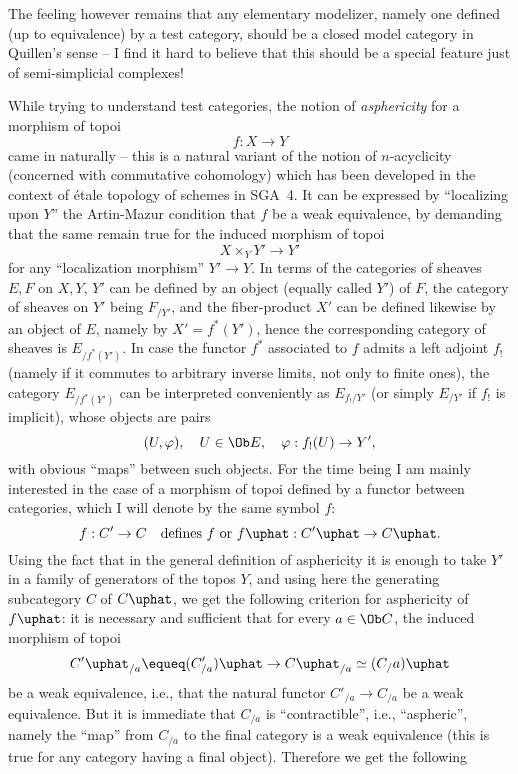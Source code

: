 The feeling however remains that any elementary modelizer, namely one
defined (up to equivalence) by a test category, should be a closed
model category in Quillen's sense -- I find it hard to believe that
this should be a special feature just of semi-simplicial complexes!

While trying to understand test categories, the notion of
\emph{asphericity} for a morphism of topoi
\[ f:X\to Y\]
came in naturally -- this is a natural variant of the notion of
$n$-acyclicity (concerned with commutative cohomology) which has been
developed in the context of \'etale topology of schemes in SGA~4. It
can be expressed by ``localizing upon $Y$'' the Artin-Mazur condition
that $f$ be a weak equivalence, by demanding that the same remain true
for the induced morphism of topoi
\[ X \times_Y Y' \to Y' \]
for any ``localization morphism'' $Y'\to Y$. In terms of the
categories of sheaves $E,F$ on $X,Y$, $Y'$ can be defined by an object
(equally called $Y'$) of $F$, the category of sheaves on $Y'$ being
$F_{/Y'}$, and the fiber-product $X'$ can be defined likewise by an
object of $E$, namely by $X'=f^*(Y')$, hence the corresponding
category of sheaves is $E_{/f^*(Y')}$. In case the functor $f^*$
associated to $f$ admits a left adjoint $f_!$ (namely if it commutes
to arbitrary inverse limits, not only to finite ones), the category
$E_{/f^*(Y')}$ can be interpreted conveniently as $E_{f_!/Y'}$ (or
simply $E_{/Y'}$ if $f_!$ is implicit), whose objects are pairs
\[ (U,\varphi), \quad U\in\Ob E, \quad \varphi : f_!(U) \to Y',\]
with obvious ``maps'' between such objects. For the time being I am
mainly interested in the case of a morphism of topoi defined by a
functor between categories, which I will denote by the same symbol
$f$:
\[ f: C' \to C \quad\text{defines $f$ or $f\uphat : {C'}\uphat
  \to C\uphat$.}\]
Using the fact that in the general definition of
asphericity it is enough to take $Y'$ in a family of generators of the
topos $Y$, and using here the generating subcategory $C$ of $C\uphat$,
we get the following criterion for asphericity of $f\uphat$: it
is necessary and sufficient that for every $a \in \Ob C$, the induced
morphism of topoi
\[ {C'}\uphat_{/a} \equeq ({C'_{/a}})\uphat \to C\uphat_{/a}
\simeq (C_/a)\uphat\]
be a weak equivalence, i.e., that the natural functor $C'_{/a}\to
C_{/a}$ be a weak equivalence. But it is immediate that $C_{/a}$ is
``contractible'', i.e., ``aspheric'', namely the ``map'' from $C_{/a}$
to the final category is a weak equivalence (this is true for any
category having a final object). Therefore we get the following

